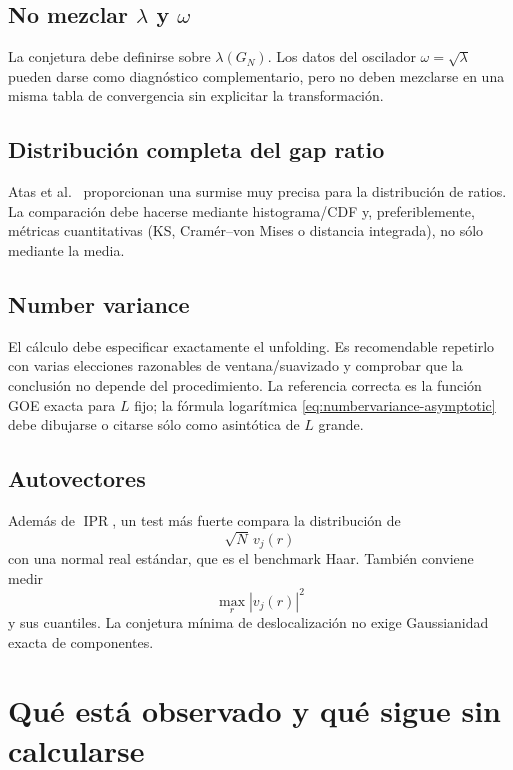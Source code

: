 \documentclass[11pt,a4paper]{article}
\newcommand{\IPR}{\operatorname{IPR}}
\begin{document}
\subsection{No mezclar $\lambda$ y $\omega$}
La conjetura debe definirse sobre $\lambda(G_N)$. Los datos del oscilador $\omega=\sqrt\lambda$ pueden darse como diagnóstico complementario, pero no deben mezclarse en una misma tabla de convergencia sin explicitar la transformación.

\subsection{Distribución completa del gap ratio}
Atas et al.~\cite{Atas2013} proporcionan una surmise muy precisa para la distribución de ratios. La comparación debe hacerse mediante histograma/CDF y, preferiblemente, métricas cuantitativas (KS, Cramér--von Mises o distancia integrada), no sólo mediante la media.

\subsection{Number variance}
El cálculo debe especificar exactamente el unfolding. Es recomendable repetirlo con varias elecciones razonables de ventana/suavizado y comprobar que la conclusión no depende del procedimiento. La referencia correcta es la función GOE exacta para $L$ fijo; la fórmula logarítmica \eqref{eq:numbervariance-asymptotic} debe dibujarse o citarse sólo como asintótica de $L$ grande.

\subsection{Autovectores}
Además de $\IPR$, un test más fuerte compara la distribución de
\begin{equation}
\sqrt{N}\,v_j(r)
\end{equation}
con una normal real estándar, que es el benchmark Haar. También conviene medir
\begin{equation}
\max_r |v_j(r)|^2
\end{equation}
y sus cuantiles. La conjetura mínima de deslocalización no exige Gaussianidad exacta de componentes.

\section{Qué está observado y qué sigue sin calcularse}
\end{document}
